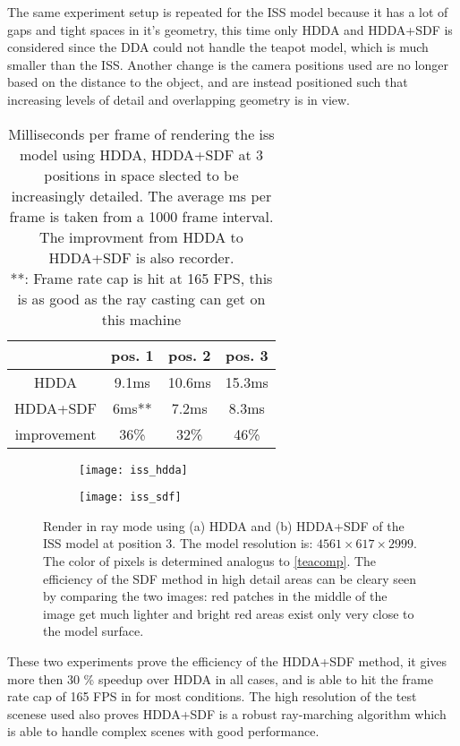 The same experiment setup is repeated for the ISS model because it has a lot of gaps and tight spaces in it's geometry, this time only HDDA and HDDA+SDF is considered since the DDA could not handle the teapot model, which is much smaller than the ISS. Another change is the camera positions used are no longer based on the distance to the object, and are instead positioned such that increasing levels of detail and overlapping geometry is in view.

\begin{table}[h]
  \centering
  \begin{tabular}{|c||c|c|c|}
    \hline
    & pos. 1 & pos. 2 & pos. 3 \\
    \hline
    HDDA & 9.1ms & 10.6ms & 15.3ms \\
    \hline
    HDDA+SDF & 6ms** & 7.2ms & 8.3ms\\
    \hline
    improvement & 36\% & 32\% & 46\%\\
    \hline
  \end{tabular}
  \caption{Milliseconds per frame of rendering the \acrshort{iss} model using HDDA, HDDA+SDF at 3 positions in space slected to be increasingly detailed. The average ms per frame is taken from a 1000 frame interval. The improvment from HDDA to HDDA+SDF is also recorder. \\
    **: Frame rate cap is hit at 165 FPS, this is as good as the ray casting can get on this machine}
\end{table}

\begin{figure}[H]
  \centering
  \begin{subfigure}[b]{0.45\textwidth}
    \texttt{[image: iss\_hdda]}
    \caption{}
  \end{subfigure}
  \hfill
  \begin{subfigure}[b]{0.45\textwidth}
    \texttt{[image: iss\_sdf]}
    \caption{}
  \end{subfigure}
  \caption{Render in ray mode using (a) HDDA and (b) HDDA+SDF of the ISS model at position 3. The model resolution is: $4561\times617\times2999$. The color of pixels is determined analogus to \cref{teacomp}. The efficiency of the SDF method in high detail areas can be cleary seen by comparing the two images: red patches in the middle of the image get much lighter and bright red areas exist only very close to the model surface.}
\end{figure}

These two experiments prove the efficiency of the HDDA+SDF method, it gives more then 30 \% speedup over HDDA in all cases, and is able to hit the frame rate cap of 165 FPS in for most conditions. The high resolution of the test scenese used also proves HDDA+SDF is a robust ray-marching algorithm which is able to handle complex scenes with good performance.

